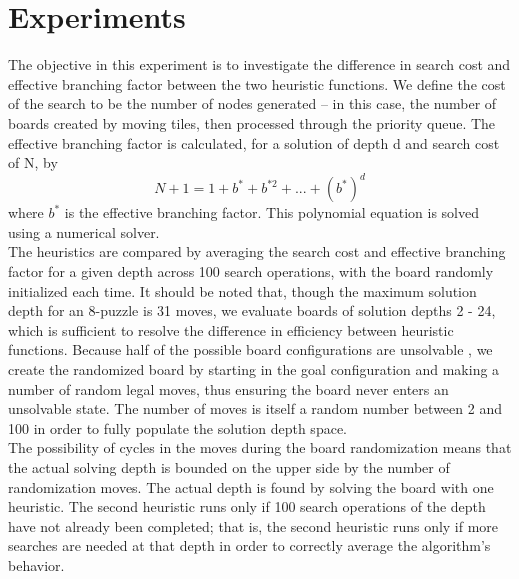 
\section{Experiments}
\label{sec:expts}

The objective in this experiment is to investigate the difference in search cost and effective branching factor between the two heuristic functions.  We define the cost of the search to be the number of nodes generated -- in this case, the number of boards created by moving tiles, then processed through the priority queue.  The effective branching factor is calculated, for a solution of depth d and search cost of N, by 
$$ N + 1 = 1 + b^* + b^{*2} + ... + (b^*)^d $$
where $b^*$ is the effective branching factor.  This polynomial equation is solved using a numerical solver. \\

The heuristics are compared by averaging the search cost and effective branching factor for a given depth across 100 search operations, with the board randomly initialized each time.  It should be noted that, though the maximum solution depth for an 8-puzzle is 31 moves, we evaluate boards of solution depths 2 - 24, which is sufficient to resolve the difference in efficiency between heuristic functions.  Because half of the possible board configurations are unsolvable \cite{15notes}, we create the randomized board by starting in the goal configuration and making a number of random legal moves, thus ensuring the board never enters an unsolvable state.  The number of moves is itself a random number between 2 and 100 in order to fully populate the solution depth space. \\

The possibility of cycles in the moves during the board randomization means that the actual solving depth is bounded on the upper side by the number of randomization moves.  The actual depth is found by solving the board with one heuristic.  The second heuristic runs only if 100 search operations of the depth have not already been completed; that is, the second heuristic runs only if more searches are needed at that depth in order to correctly average the algorithm's behavior. \\

